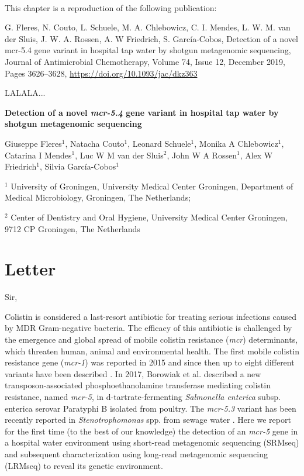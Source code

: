 \mbox{}\\
\vspace{8cm}

This chapter is a reproduction of the following publication:

G. Fleres, N. Couto, L. Schuele, M. A. Chlebowicz, C. I. Mendes, L. W. M. van der Sluis, J. W. A. Rossen, A. W Friedrich, S. García-Cobos, Detection of a novel mcr-5.4 gene variant in hospital tap water by shotgun metagenomic sequencing, Journal of Antimicrobial Chemotherapy, Volume 74, Issue 12, December 2019, Pages 3626–3628, \url{https://doi.org/10.1093/jac/dkz363}

LALALA...


\cleardoublepage 

\begin{center}
\large
\textbf{Detection of a novel \textit{mcr-5.4} gene
variant in hospital tap water by
shotgun metagenomic sequencing}
\end{center}

Giuseppe Fleres$^1$, 
Natacha Couto$^1$, 
Leonard Schuele$^1$,
Monika A Chlebowicz$^1$,
Catarina I Mendes$^1$,
Luc W M van der Sluis$^2$, 
John W A Rossen$^1$, 
Alex W Friedrich$^1$, 
Silvia García-Cobos$^1$

$^1$ University of Groningen, University Medical Center Groningen, Department of Medical Microbiology, Groningen, The Netherlands;

$^2$ Center of Dentistry and Oral Hygiene, University
Medical Center Groningen, 9712 CP Groningen, The Netherlands

\section{Letter}

Sir,

Colistin is considered a last-resort antibiotic for treating serious infections caused by MDR Gram-negative bacteria. 
The efficacy of this antibiotic is challenged by the emergence and global spread of mobile colistin resistance (\textit{mcr}) determinants, which threaten human, animal and environmental health. 
The first mobile colistin resistance gene (\textit{mcr-1}) was reported in 2015 and since then up to eight different variants have been described \citep{wang_emergence_2018}. 
In 2017, Borowiak et al.\citep{borowiak_identification_2017} described a new transposon-associated phosphoethanolamine transferase mediating colistin resistance, named \textit{mcr-5}, in d-tartrate-fermenting \textit{Salmonella enterica} subsp. enterica serovar Paratyphi B isolated from poultry. 
The \textit{mcr-5.3} variant has been recently reported in \textit{Stenotrophomonas} spp. from sewage water \citep{li_co-occurrence_2019}.
Here we report for the first time (to the best of our knowledge) the detection of an \textit{mcr-5} gene in a hospital water environment using short-read metagenomic sequencing (SRMseq) and subsequent characterization using long-read metagenomic sequencing (LRMseq) to reveal its genetic environment.

